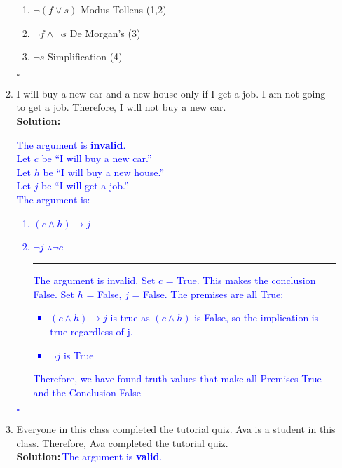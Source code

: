 \documentclass{article}
\renewcommand{\implies}{\rightarrow}
\newcommand{\sol}[1]{\textbf{Solution:\,}\textcolor{blue}{#1}}
\begin{document}
\begin{enumerate}
\begin{enumerate}
{\begin{enumerate}[label =(\arabic*), ref = \arabic*]
	\vspace{5pt} \hrule \vspace{5pt}
	\item $\neg (f \lor s)$ \hfill	Modus Tollens (1,2)
	\item $\neg f \land \neg s$ \hfill	De Morgan's (3)
	\item $\neg s$ \hfill	Simplification (4)
\end{enumerate} 
\hfill $\square$
}
\item I will buy a new car and a new house only if I get a job. I am not going to get a job. Therefore, I will not buy a new car.
\\\sol{The argument is \textbf{invalid}.\\
	Let $c$ be ``I will buy a new car.''\\
	Let $h$ be ``I will buy a new house.''\\ 
	Let $j$ be ``I will get a job.''\\ 
	The argument is:
\begin{enumerate}[label =(\arabic*), ref = \arabic*]
	\item $(c\land h)\implies j$
	\item $\neg j$\hspace{50pt} $\therefore \neg c$ \vspace{3pt}
	\vspace{5pt} \hrule \vspace{5pt}
    The argument is invalid. Set $c$ = True. This makes the conclusion False. Set $h$ = False, $j$ = False. The premises are all True:
        \begin{itemize}
        \item $(c\land h)\implies j$ is true as $(c \land h)$ is False, so the implication is true regardless of j.
        \item $\neg j$ is True
        \end{itemize}
        Therefore, we have found truth values that make all Premises True and the Conclusion False
\end{enumerate} 
\hfill $\square$
}
\item Everyone in this class completed the tutorial quiz. Ava is a student in this class. Therefore, Ava completed the tutorial quiz.
\\\sol{The argument is \textbf{valid}.\\
}
\end{enumerate}
\end{enumerate}
\end{document}
